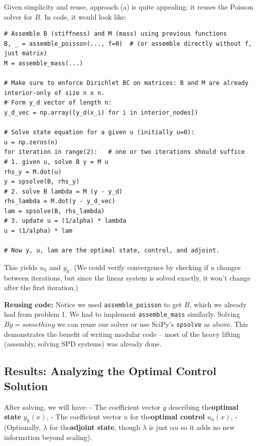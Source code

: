 \documentclass[a4paper,10pt]{report}
\begin{document}
Given simplicity and reuse, approach (a) is quite appealing: it reuses the Poisson solver for \(B\). In code, it would look like:

\begin{verbatim}
# Assemble B (stiffness) and M (mass) using previous functions
B, _ = assemble_poisson(..., f=0)  # (or assemble directly without f, just matrix)
M = assemble_mass(...)

# Make sure to enforce Dirichlet BC on matrices: B and M are already interior-only of size n x n.
# Form y_d vector of length n:
y_d_vec = np.array([y_d(x_i) for i in interior_nodes])

# Solve state equation for a given u (initially u=0):
u = np.zeros(n)
for iteration in range(2):   # one or two iterations should suffice
# 1. given u, solve B y = M u
rhs_y = M.dot(u)
y = spsolve(B, rhs_y)
# 2. solve B lambda = M (y - y_d)
rhs_lambda = M.dot(y - y_d_vec)
lam = spsolve(B, rhs_lambda)
# 3. update u = (1/alpha) * lambda
u = (1/alpha) * lam

# Now y, u, lam are the optimal state, control, and adjoint.
\end{verbatim}

This yields \(u_h\) and \(y_h\). (We could verify convergence by checking if \(u\) changes between iterations, but since the linear system is solved exactly, it won't change after the first iteration.)

\textbf{Reusing code:} Notice we used \texttt{assemble_poisson} to get \(B\), which we already had from problem 1. We had to implement \texttt{assemble_mass} similarly. Solving \(B y = something\) we can reuse our solver or use SciPy's \texttt{spsolve} as above.
This demonstrates the benefit of writing modular code -- most of the heavy lifting (assembly, solving SPD systems) was already done.

\subsection{Results: Analyzing the Optimal Control Solution}
After solving, we will have:
- The coefficient vector \(y\) describing the\textbf{optimal state} \(y_h(x)\),
- The coefficient vector \(u\) for the\textbf{optimal control} \(u_h(x)\),
- (Optionally, \(\lambda\) for the\textbf{adjoint state}, though \(\lambda\) is just \(\alpha u\) so it adds no new information beyond scaling).
\end{document}
